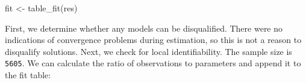 \documentclass[
  man,floatsintext]{apa6}
\newenvironment{Shaded}{\begin{snugshade}}{\end{snugshade}}
\newcommand{\DecValTok}[1]{\textcolor[rgb]{0.00,0.00,0.81}{#1}}
\newcommand{\FunctionTok}[1]{\textcolor[rgb]{0.00,0.00,0.00}{#1}}
\newcommand{\NormalTok}[1]{#1}
\newcommand{\OtherTok}[1]{\textcolor[rgb]{0.56,0.35,0.01}{#1}}
\newcommand{\SpecialCharTok}[1]{\textcolor[rgb]{0.00,0.00,0.00}{#1}}
\newcommand{\StringTok}[1]{\textcolor[rgb]{0.31,0.60,0.02}{#1}}
\begin{document}
\begin{Shaded}
\begin{Highlighting}[]
\NormalTok{fit }\OtherTok{\textless{}{-}} \FunctionTok{table\_fit}\NormalTok{(res)}
\end{Highlighting}
\end{Shaded}

First, we determine whether any models can be disqualified.
There were no indications of convergence problems during estimation, so this is not a reason to disqualify solutions.
Next, we check for local identifiability.
The sample size is \texttt{5605}.
We can calculate the ratio of observations to parameters and append it to the fit table:

\begin{Shaded}
\end{Shaded}
\end{document}
